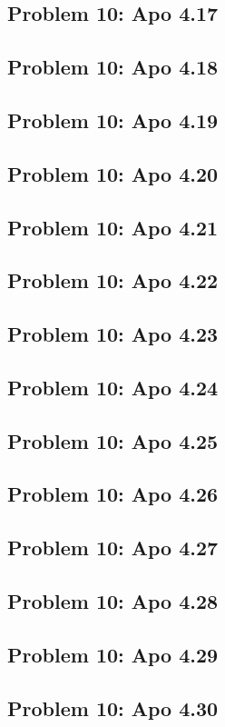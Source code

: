 \subsection[Problem 17]{Problem 10: Apo 4.17}

\subsection[Problem 18]{Problem 10: Apo 4.18}

\subsection[Problem 19]{Problem 10: Apo 4.19}

\subsection[Problem 20]{Problem 10: Apo 4.20}

\subsection[Problem 21]{Problem 10: Apo 4.21}

\subsection[Problem 22]{Problem 10: Apo 4.22}

\subsection[Problem 23]{Problem 10: Apo 4.23}

\subsection[Problem 24]{Problem 10: Apo 4.24}

\subsection[Problem 25]{Problem 10: Apo 4.25}

\subsection[Problem 26]{Problem 10: Apo 4.26}

\subsection[Problem 27]{Problem 10: Apo 4.27}

\subsection[Problem 28]{Problem 10: Apo 4.28}

\subsection[Problem 29]{Problem 10: Apo 4.29}

\subsection[Problem 30]{Problem 10: Apo 4.30}